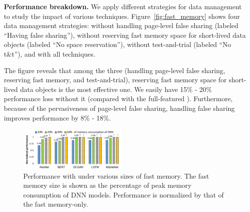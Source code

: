 \begin{spacing}{0.95}
\textbf{Performance breakdown.}
We apply different strategies for data management to study the impact of various techniques. Figure~\ref{fig:fast_memory} shows %
four data management strategies: \name without handling page-level false sharing (labeled ``Having false sharing''), \name without reserving fast memory space for short-lived data objects (labeled ``No space reservation''), \name without test-and-trial (labeled ``No t\&t''), and \name with all techniques.
\end{spacing}

The figure reveals that among the three (handling page-level false sharing, reserving fast memory, and test-and-trial), 
reserving fast memory space for short-lived data objects is the most effective one. We easily have \textcolor{check}{15\% - 20\%} 
performance loss without it (compared with the full-featured \name). Furthermore, because of the pervasiveness of page-level false sharing, handling false sharing improves performance by \textcolor{check}{8\% - 18\%}.

\begin{figure}[tb!]
	\centering
	\includegraphics[width=0.48\textwidth,height=0.38\linewidth]{figures/diff_size.pdf}
	\vspace{-20pt}
\caption{
 Performance with \name under various sizes of fast memory. The fast memory size is shown as the percentage of peak memory consumption of DNN models. Performance is normalized by that of the fast memory-only.
}
\vspace{-10pt}
\label{fig:fast_memory_sen}
\end{figure}


